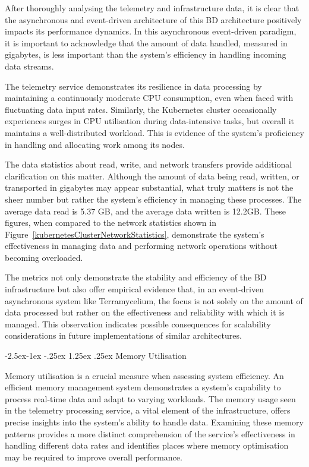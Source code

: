 \documentclass[review]{elsarticle}
\makeatletter
\renewcommand\paragraph{\@startsection{paragraph}{4}{\z@}%
            {-2.5ex\@plus -1ex \@minus -.25ex}%
            {1.25ex \@plus .25ex}%
            {\normalfont\normalsize\itshape}}
\makeatother
\begin{document}
After thoroughly analysing the telemetry and infrastructure data, it is clear that the asynchronous and event-driven architecture of this BD architecture positively impacts its performance dynamics. In this asynchronous event-driven paradigm, it is important to acknowledge that the amount of data handled, measured in gigabytes, is less important than the system's efficiency in handling incoming data streams.

The telemetry service demonstrates its resilience in data processing by maintaining a continuously moderate CPU consumption, even when faced with fluctuating data input rates. Similarly, the Kubernetes cluster occasionally experiences surges in CPU utilisation during data-intensive tasks, but overall it maintains a well-distributed workload. This is evidence of the system's proficiency in handling and allocating work among its nodes.

The data statistics about read, write, and network transfers provide additional clarification on this matter. Although the amount of data being read, written, or transported in gigabytes may appear substantial, what truly matters is not the sheer number but rather the system's efficiency in managing these processes. The average data read is 5.37 GB, and the average data written is 12.2GB. These figures, when compared to the network statistics shown in Figure~\ref{kubernetesClusterNetworkStatistics}, demonstrate the system's effectiveness in managing data and performing network operations without becoming overloaded.

The metrics not only demonstrate the stability and efficiency of the BD infrastructure but also offer empirical evidence that, in an event-driven asynchronous system like Terramycelium, the focus is not solely on the amount of data processed but rather on the effectiveness and reliability with which it is managed. This observation indicates possible consequences for scalability considerations in future implementations of similar architectures.

\paragraph{Memory Utilisation}

Memory utilisation is a crucial measure when assessing system efficiency. An efficient memory management system demonstrates a system's capability to process real-time data and adapt to varying workloads. The memory usage seen in the telemetry processing service, a vital element of the infrastructure, offers precise insights into the system's ability to handle data. Examining these memory patterns provides a more distinct comprehension of the service's effectiveness in handling different data rates and identifies places where memory optimisation may be required to improve overall performance.
\end{document}
